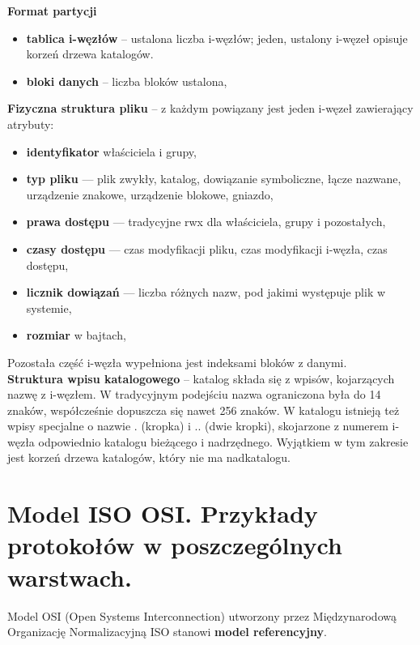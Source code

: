 \documentclass[main.tex]{subfiles}
\begin{document}
    \noindent \textbf{Format partycji}
    \begin{itemize}[noitemsep]
        \item \textbf{tablica i-węzłów} -- ustalona liczba i-węzłów; jeden, ustalony i-węzeł opisuje korzeń drzewa katalogów.
        \item \textbf{bloki danych} -- liczba bloków ustalona,
    \end{itemize}


    \noindent \textbf{Fizyczna struktura pliku} -- z każdym powiązany jest jeden i-węzeł zawierający atrybuty:
    \begin{itemize}[noitemsep]
        \item \textbf{identyfikator} właściciela i grupy,
        \item \textbf{typ pliku} — plik zwykły, katalog, dowiązanie symboliczne, łącze nazwane, urządzenie znakowe,
        urządzenie blokowe, gniazdo,
        \item \textbf{prawa dostępu} — tradycyjne rwx dla właściciela, grupy i pozostałych,
        \item \textbf{czasy dostępu} — czas modyfikacji pliku, czas modyfikacji i-węzła, czas dostępu,
        \item \textbf{licznik dowiązań} — liczba różnych nazw, pod jakimi występuje plik w systemie,
        \item \textbf{rozmiar} w bajtach,
    \end{itemize}
    Pozostała część i-węzła wypełniona jest indeksami bloków z danymi.\\

    \noindent \textbf{Struktura wpisu katalogowego} -- katalog składa się z wpisów, kojarzących nazwę z i-węzłem.
    W tradycyjnym podejściu nazwa ograniczona była do 14 znaków, współcześnie dopuszcza się nawet 256 znaków.
    W katalogu istnieją też wpisy specjalne o nazwie . (kropka) i .. (dwie kropki), skojarzone z numerem i-węzła
    odpowiednio katalogu bieżącego i nadrzędnego. Wyjątkiem w tym zakresie jest korzeń drzewa
    katalogów, który nie ma nadkatalogu.


    \section{Model ISO OSI. Przykłady protokołów w poszczególnych warstwach.}
    Model OSI (Open Systems Interconnection) utworzony przez Międzynarodową Organizację Normalizacyjną ISO stanowi
    \textbf{model referencyjny}.
\end{document}

